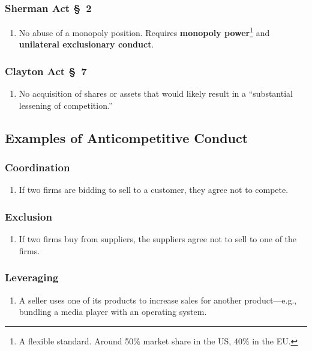 \subsubsection{Sherman Act \S\ 2}

\begin{enumerate}
    \item No abuse of a monopoly position. Requires \textbf{monopoly 
    power}\footnote{A flexible standard. Around 50\% market share in the US, 
    40\% in the EU.} and \textbf{unilateral exclusionary conduct}.
\end{enumerate}

\subsubsection{Clayton Act \S\ 7}

\begin{enumerate}
    \item No acquisition of shares or assets that would likely result in a 
    ``substantial lessening of competition.''
\end{enumerate}

\subsection{Examples of Anticompetitive Conduct}
\label{sub:conduct-examples}

\subsubsection{Coordination}

\begin{enumerate}
    \item If two firms are bidding to sell to a customer, they agree not to 
    compete.
\end{enumerate}

\subsubsection{Exclusion}

\begin{enumerate}
    \item If two firms buy from suppliers, the suppliers agree not to sell to 
    one of the firms.
\end{enumerate}

\subsubsection{Leveraging}

\begin{enumerate}
    \item A seller uses one of its products to increase sales for another 
    product---e.g., bundling a media player with an operating system.
\end{enumerate}
